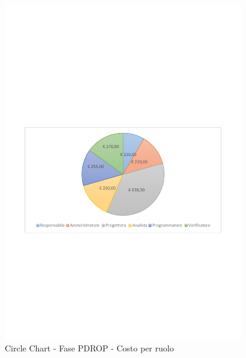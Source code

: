 \documentclass[../PianoProgetto.tex]{subfiles}
\begin{document}
	\begin{figure}[!h]
		\centering
		\includegraphics[width=0.93\textwidth , trim=2cm 9.5cm 2cm 11cm]{grafici/PDROP/PDROP-costo}
			\caption{Circle Chart - Fase PDROP - Costo per ruolo}
		\label{fig:CircleChart-fasePDROP_costo}
	\end{figure}
\vfill
\end{document}
